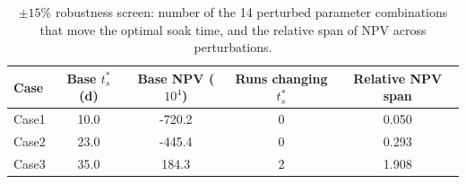 \begin{table}[htbp]
\centering
\caption{$\pm15\%$ robustness screen: number of the 14 perturbed parameter combinations that move the optimal soak time, and the relative span of NPV across perturbations.}
\label{tab:robust}
\small
\begin{tabular}{@{}lcccc@{}}
\toprule
Case & Base $t_s^\ast$ (d) & Base NPV ($10^4$) & Runs changing $t_s^\ast$ & Relative NPV span \\
\midrule
Case1 & 10.0 & -720.2 & 0 & 0.050 \\
Case2 & 23.0 & -445.4 & 0 & 0.293 \\
Case3 & 35.0 & 184.3 & 2 & 1.908 \\
\bottomrule
\end{tabular}
\end{table}
